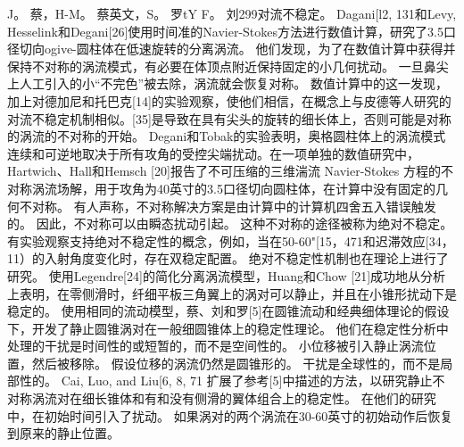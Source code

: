\documentclass[UTF8,11pt,a4paper,openany,fontset=fandol]{ctexbook}
\begin{document}
J。 蔡，H-M。 蔡英文，S。 罗tY F。 刘299对流不稳定。 Dagani[l2, 131和Levy, Hesselink和Degani[26]使用时间准的Navier-Stokes方法进行数值计算，研究了3.5口径切向ogive-圆柱体在低速旋转的分离涡流。 他们发现，为了在数值计算中获得并保持不对称的涡流模式，有必要在体顶点附近保持固定的小几何扰动。 一旦鼻尖上人工引入的小“不完色”被去除，涡流就会恢复对称。 数值计算中的这一发现，加上对德加尼和托巴克[14]的实验观察，使他们相信，在概念上与皮德等人研究的对流不稳定机制相似。[35]是导致在具有尖头的旋转的细长体上，否则可能是对称的涡流的不对称的开始。 Degani和Tobak的实验表明，奥格圆柱体上的涡流模式连续和可逆地取决于所有攻角的受控尖端扰动。在一项单独的数值研究中，Hartwich、Hall和Hemsch [20]报告了不可压缩的三维湍流 Navier-Stokes 方程的不对称涡流场解，用于攻角为40英寸的3.5口径切向圆柱体，在计算中没有固定的几何不对称。 有人声称，不对称解决方案是由计算中的计算机四舍五入错误触发的。 因此，不对称可以由瞬态扰动引起。 这种不对称的途径被称为绝对不稳定。 有实验观察支持绝对不稳定性的概念，例如，当在50-60"[15，471和迟滞效应[34，11）的入射角度变化时，存在双稳定配置。 绝对不稳定性机制也在理论上进行了研究。 使用Legendre[24]的简化分离涡流模型，Huang和Chow [21]成功地从分析上表明，在零侧滑时，纤细平板三角翼上的涡对可以静止，并且在小锥形扰动下是稳定的。 使用相同的流动模型，蔡、刘和罗[5]在圆锥流动和经典细体理论的假设下，开发了静止圆锥涡对在一般细圆锥体上的稳定性理论。 他们在稳定性分析中处理的干扰是时间性的或短暂的，而不是空间性的。 小位移被引入静止涡流位置，然后被移除。 假设位移的涡流仍然是圆锥形的。 干扰是全球性的，而不是局部性的。 Cai, Luo, and Liu[6, 8, 71 扩展了参考[5]中描述的方法，以研究静止不对称涡流对在细长锥体和有和没有侧滑的翼体组合上的稳定性。 在他们的研究中，在初始时间引入了扰动。 如果涡对的两个涡流在30-60英寸的初始动作后恢复到原来的静止位置。
\end{document}
